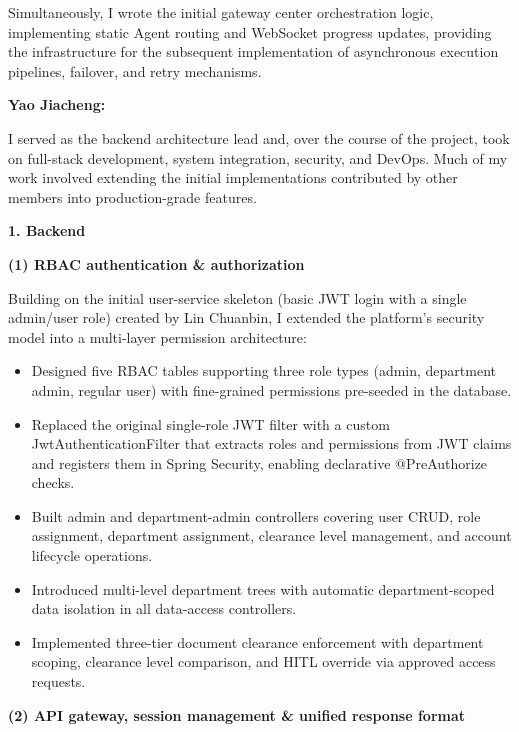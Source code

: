 Simultaneously, I wrote the initial gateway center orchestration logic, implementing static Agent routing and WebSocket progress updates, providing the infrastructure for the subsequent implementation of asynchronous execution pipelines, failover, and retry mechanisms.

\vspace{4mm}

\noindent\textbf{Yao Jiacheng:}

\vspace{2mm}

I served as the backend architecture lead and, over the course of the project, took on full-stack development, system integration, security, and DevOps. Much of my work involved extending the initial implementations contributed by other members into production-grade features.

\textbf{1. Backend}

\textbf{(1) RBAC authentication \& authorization}

Building on the initial user-service skeleton (basic JWT login with a single admin/user role) created by Lin Chuanbin, I extended the platform's security model into a multi-layer permission architecture:

\begin{itemize}
  \item Designed five RBAC tables supporting three role types (admin, department admin, regular user) with fine-grained permissions pre-seeded in the database.
  \item Replaced the original single-role JWT filter with a custom JwtAuthenticationFilter that extracts roles and permissions from JWT claims and registers them in Spring Security, enabling declarative @PreAuthorize checks.
  \item Built admin and department-admin controllers covering user CRUD, role assignment, department assignment, clearance level management, and account lifecycle operations.
  \item Introduced multi-level department trees with automatic department-scoped data isolation in all data-access controllers.
  \item Implemented three-tier document clearance enforcement with department scoping, clearance level comparison, and HITL override via approved access requests.
\end{itemize}

\textbf{(2) API gateway, session management \& unified response format}


